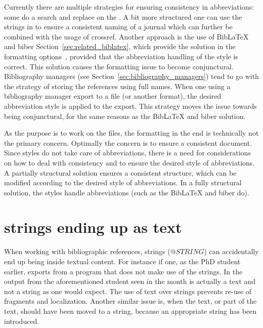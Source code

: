 Currently there are multiple strategies for ensuring consistency in
abbreviations: some do a search and replace on the .  A bit
more structured one can use the strings in {\bibtex} to ensure a
consistent naming of a journal which can further be combined with the
usage of crossref.  Another approach is the use of Bib{\LaTeX} and
biber Section~\ref{sec:related_biblatex}, which provide the solution
in the formatting options~\cite{koppensteiner2011abbreviate}, provided
that the abbreviation handling of the style is correct.  This solution
causes the formatting issue to become conjunctural.  Bibliography
managers (see Section~\ref{sec:bibliography_managers}) tend to go with
the strategy of storing the references using full names.  When one
using a bibliography manager export to a {\bibtex} file (or another
format), the desired abbreviation style is applied to the export.
This strategy moves the issue towards being conjunctural, for the same
reasons as the Bib{\LaTeX} and biber solution.

As the purpose is to work on the {\bibtex} files, the formatting in
the end is technically not the primary concern.  Optimally the concern
is to ensure a consistent document.  Since {\bibtex} styles do not
take care of abbreviations, there is a need for considerations on how
to deal with consistency and to ensure the desired style of
abbreviations.  A partially structural solution ensures a consistent
structure, which can be modified according to the desired style of
abbreviations.  In a fully structural solution, the styles handle
abbreviations (such as the Bib{\LaTeX} and biber do).


\section{{\bibtex} strings ending up as text}
\label{sec:problems_strings_as_text}

When working with bibliographic references, {\bibtex} strings
($@STRING$) can accidentally end up being inside textual content.  For
instance if one, as the PhD student earlier, exports from a program
that does not make use of the strings.  In the output from the
aforementioned student seen in  the month
is actually a text and not a string as one would expect.  The use of
text over strings prevents re-use of fragments and localization.
Another similar issue is, when the text, or part of the text, should
have been moved to a string, because an appropriate string has been
introduced.

